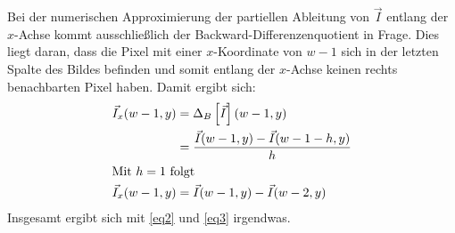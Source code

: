 \documentclass{whswinvcbook}
\begin{document}
Bei der numerischen Approximierung der partiellen Ableitung von $\vec{I}$ entlang der $x$-Achse kommt ausschließlich der Backward-Differenzenquotient in Frage. Dies liegt daran, dass die Pixel mit einer $x$-Koordinate von $w-1$ sich in der letzten Spalte des Bildes befinden und somit entlang der $x$-Achse keinen rechts benachbarten Pixel haben. Damit ergibt sich:
\begin{align} \label{eq3}
    \vec{I}_x(w-1,y) &= \Delta_B\left[\vec{I}\right](w-1,y) \nonumber \\
    &= \frac{\vec{I}(w-1,y)-\vec{I}(w-1-h,y)}{h} \nonumber \\
\shortintertext{Mit $h=1$ folgt}
    \vec{I}_x(w-1,y) &= \vec{I}(w-1,y)-\vec{I}(w-2,y)
\end{align}
Insgesamt ergibt sich mit \ref{eq2} und \ref{eq3} irgendwas.
\begin{figure}[H]
    \centering
    \quad\quad
    \\
\end{figure}
\end{document}
